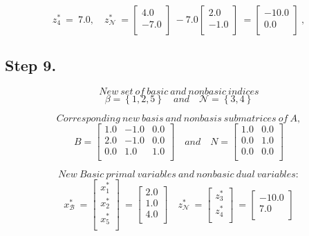\documentclass [12pt] {article}
\begin{document}
\[
z_{4}^{*}\ =\ 7.0, \quad z_{\mathcal N}^{*}\ =\begin{bmatrix}
4.0 \\ -7.0 \\ 
\end{bmatrix}\ -7.0\begin{bmatrix}
2.0 \\ -1.0 \\ 
\end{bmatrix}\ =\begin{bmatrix}
-10.0 \\ 0.0 \\ 
\end{bmatrix}\ ,
\]
\subsection{Step 9.}

\[ New\ set\  of\  basic\  and\  nonbasic\  indices \]
\[
\beta= \left\{1, 2, 5\right\} \quad and \quad  \mathcal{N}=\left\{3, 4\right\}
\]

\[
Corresponding\ new\ basis\ and\ nonbasis\ submatrices\ of\ A,
\]
\[
B =
\begin{bmatrix}
1.0 & -1.0 & 0.0 \\ 2.0 & -1.0 & 0.0 \\ 0.0 & 1.0 & 1.0 \\ 
\end{bmatrix} \quad and \quad
\mathit{N} =
\begin{bmatrix}
1.0 & 0.0 \\ 0.0 & 1.0 \\ 0.0 & 0.0 \\ 
\end{bmatrix}
\]

\[
New\ Basic\ primal\ variables\ and\ nonbasic\ dual\ variables:
\]
\[
x_{\mathcal B}^{*}\ =\begin{bmatrix}
x_{1}^{*} \\x_{2}^{*} \\x_{5}^{*} \\
\end{bmatrix}\ =\begin{bmatrix}
2.0 \\ 1.0 \\ 4.0 \\ 
\end{bmatrix}\quad
z_{\mathcal N}^{*}\ =\begin{bmatrix}
z_{3}^{*} \\z_{4}^{*} \\
\end{bmatrix}\ =\begin{bmatrix}
-10.0 \\ 7.0 \\ 
\end{bmatrix}
\]
\end{document}
